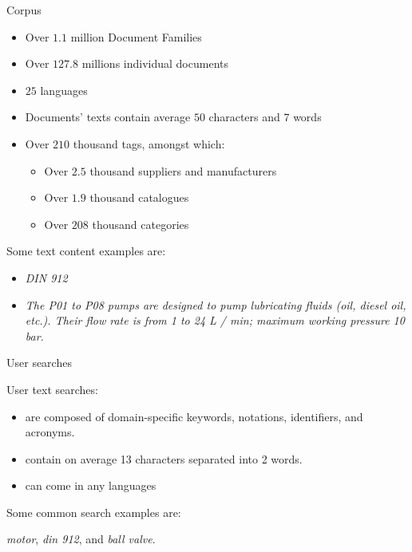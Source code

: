 \begin{frame}{Corpus}
    
    \begin{itemize}
        \item Over $1.1$ million Document Families
        \item Over $127.8$ millions individual documents
        \item $25$ languages
        \item Documents' texts contain average $50$ characters and $7$ words
        \item Over $210$ thousand tags, amongst which:
        \begin{itemize}
            \item Over $2.5$ thousand suppliers and manufacturers
            \item Over $1.9$ thousand catalogues
            \item Over $208$ thousand categories
        \end{itemize}
    \end{itemize}

    Some text content examples are:
    \begin{itemize}
        \item \emph{DIN 912}
        \item \emph{The P01 to P08 pumps are designed to pump lubricating fluids (oil, diesel oil, etc.). Their flow rate is from 1 to 24 L / min; maximum working pressure 10 bar.} 
    \end{itemize}

\end{frame}

\begin{frame}{User searches}
    
    User text searches:
    \begin{itemize}
        \item are composed of domain-specific keywords, notations, identifiers, and
        acronyms.
        \item contain on average 13 characters separated into 2 words.
        \item can come in any languages
    \end{itemize}

    Some common search examples are:
    \begin{center}
        \emph{motor}, \emph{din 912}, and \emph{ball valve}.
    \end{center}
    
\end{frame}



